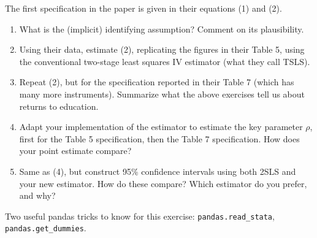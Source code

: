\documentclass[12pt]{amsart}
\begin{document}
The first specification in the paper is given in their equations (1)
and (2).

\begin{enumerate}
\item What is the (implicit) identifying assumption?  Comment on
its plausibility.
\item Using their data, estimate (2), replicating the
figures in their Table 5, using the conventional two-stage least squares IV estimator
(what they call TSLS).
\item Repeat (2), but for the specification reported in their Table 7
(which has many more instruments).  Summarize what the above
exercises tell us about returns to education.
\item Adapt your implementation of the \citeauthor{chernozhukov-hansen08} estimator to estimate the key parameter \(\rho\), first for the Table 5 specification, then the Table 7 specification.  How does your point estimate compare?
\item Same as (4), but construct 95\% confidence intervals using both 2SLS and your new estimator.  How do these compare?  Which estimator do you prefer, and why?
\end{enumerate}

Two useful pandas tricks to know for this exercise:
\texttt{pandas.read\_stata}, \texttt{pandas.get\_dummies}.

\printbibliography
\end{document}
